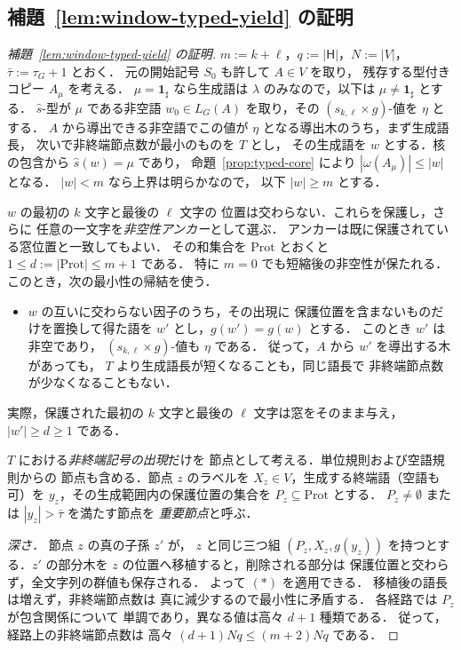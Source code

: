 \documentclass[11pt,a4paper]{ltjsarticle}
\theoremstyle{remark}
\theoremstyle{plain}
\begin{document}
\subsection{補題~\ref{lem:window-typed-yield} の証明}
\begin{proof}[補題~\ref{lem:window-typed-yield} の証明]
$m:=k+\ell$，$q:=|\mathsf H|$，$N:=|V|$，
$\bar\tau:=\tau_G+1$ とおく．
元の開始記号 $S_0$ も許して $A\in V$ を取り，
残存する型付きコピー $A_\mu$ を考える．
$\mu=\mathbf{1}_{\sharp}$ なら生成語は
$\lambda$ のみなので，以下は
$\mu\ne\mathbf{1}_{\sharp}$ とする．
$\widehat s$-型が $\mu$ である非空語
$w_0\in L_G(A)$ を取り，その
$(s_{k,\ell}\times g)$-値を $\eta$ とする．
$A$ から導出できる非空語でこの値が
$\eta$ となる導出木のうち，まず生成語長，
次いで非終端節点数が最小のものを $T$ とし，
その生成語を $w$ とする．核の包含から
$\widehat s(w)=\mu$ であり，
命題~\ref{prop:typed-core} により
$|\omega(A_\mu)|\le|w|$ となる．
$|w|<m$ なら上界は明らかなので，
以下 $|w|\ge m$ とする．

$w$ の最初の $k$ 文字と最後の $\ell$ 文字の
位置は交わらない．これらを保護し，さらに
任意の一文字を\emph{非空性アンカー}として選ぶ．
アンカーは既に保護されている窓位置と一致してもよい．
その和集合を $\mathrm{Prot}$ とおくと
$1\le d:=|\mathrm{Prot}|\le m+1$ である．
特に $m=0$ でも短縮後の非空性が保たれる．
このとき，次の最小性の帰結を使う．
\begin{itemize}[leftmargin=2.2em]
\item[$(\ast)$]
$w$ の互いに交わらない因子のうち，その出現に
保護位置を含まないものだけを置換して得た語を
$w'$ とし，$g(w')=g(w)$ とする．
このとき $w'$ は非空であり，
$(s_{k,\ell}\times g)$-値も $\eta$ である．
従って，$A$ から $w'$ を導出する木があっても，
$T$ より生成語長が短くなることも，同じ語長で
非終端節点数が少なくなることもない．
\end{itemize}
実際，保護された最初の $k$ 文字と最後の
$\ell$ 文字は窓をそのまま与え，
$|w'|\ge d\ge1$ である．

$T$ における\emph{非終端記号の出現}だけを
節点として考える．単位規則および空語規則からの
節点も含める．節点 $z$ のラベルを
$X_z\in V$，生成する終端語（空語も可）を
$y_z$，その生成範囲内の保護位置の集合を
$P_z\subseteq\mathrm{Prot}$ とする．
$P_z\ne\emptyset$ または
$|y_z|>\bar\tau$ を満たす節点を
\emph{重要節点}と呼ぶ．

\emph{深さ．}
節点 $z$ の真の子孫 $z'$ が，
$z$ と同じ三つ組 $(P_z,X_z,g(y_z))$
を持つとする．$z'$ の部分木を
$z$ の位置へ移植すると，削除される部分は
保護位置と交わらず，全文字列の群値も保存される．
よって $(\ast)$ を適用できる．
移植後の語長は増えず，非終端節点数は
真に減少するので最小性に矛盾する．
各経路では $P_z$ が包含関係について
単調であり，異なる値は高々 $d+1$ 種類である．
従って，経路上の非終端節点数は
高々 $(d+1)Nq\le(m+2)Nq$ である．


\end{proof}
\end{document}
